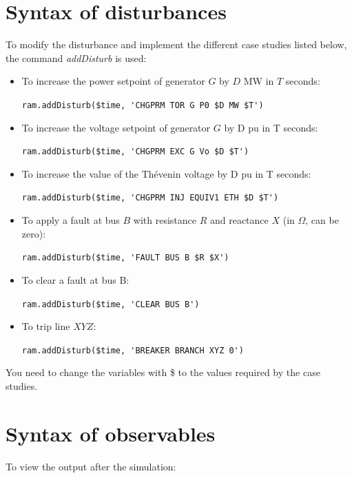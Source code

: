 \documentclass[a4paper,11pt,oneside,onecolumn]{article}
\newcommand\textcode{\Verb}
\begin{document}
\section{Syntax of disturbances}

To modify the disturbance and implement the different case studies listed below, the command \textit{addDisturb} is used:

\begin{itemize}
\item To increase the power setpoint of generator $G$ by $D$ MW in $T$ seconds: 

\textcode|ram.addDisturb($time, 'CHGPRM TOR G P0 $D MW $T')|

\item To increase the voltage setpoint of generator $G$ by D pu in T seconds: 

\textcode|ram.addDisturb($time, 'CHGPRM EXC G Vo $D $T')|

\item To increase the value of the Thévenin voltage by D pu in T seconds: 

\textcode|ram.addDisturb($time, 'CHGPRM INJ EQUIV1 ETH $D $T')|

\item To apply a fault at bus $B$ with resistance $R$ and reactance $X$ (in $\Omega$, can be zero): 

\textcode|ram.addDisturb($time, 'FAULT BUS B $R $X')|

\item To clear a fault at bus B: 

\textcode|ram.addDisturb($time, 'CLEAR BUS B')|

\item To trip line $XYZ$:

\textcode|ram.addDisturb($time, 'BREAKER BRANCH XYZ 0')|

\end{itemize}

\noindent You need to change the variables with \$ to the values required by the case studies.

\section{Syntax of observables}

To view the output after the simulation:
\end{document}
